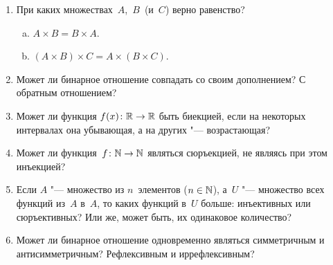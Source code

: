 \begin{enumerate}%
  \item При каких множествах~$A$,~$B$~(и~$C$) верно равенство?
    \begin{enumerate}[a)]%
      \item $ A \times B = B \times A $.
      \item $ (A \times B) \times C = A \times (B \times C) $.
    \end{enumerate}


  \item Может ли бинарное отношение совпадать со своим дополнением? С обратным отношением?
  
  \item Может ли функция $ f(x)\colon \mathbb R \to \mathbb R $ быть биекцией,
    если на некоторых интервалах она убывающая, а на других "--- возрастающая?

  \item Может ли функция~$ f\colon \mathbb N \to \mathbb N $ являться сюръекцией,
    не являясь при этом инъекцией? 

  \item Если $A$ "--- множество из $n$~элементов ($ n \in \mathbb N $), 
    а~$U$ "--- множество всех функций из~$A$ в~$A$,
    то каких функций в~$U$ больше: инъективных или сюръективных?
    Или же, может быть, их одинаковое количество? 
  
  \item Может ли бинарное отношение одновременно являться симметричным и антисимметричным?
    Рефлексивным и иррефлексивным?
\end{enumerate}